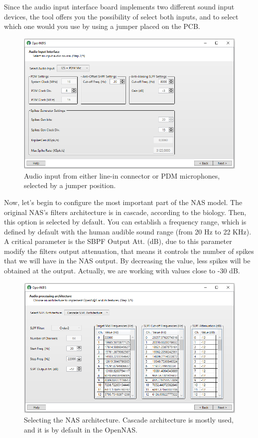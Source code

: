 Since the audio input interface board implements two different sound input devices, the tool offers you the possibility of select both inputs, and to select which one would you use by using a jumper placed on the PCB.

\begin{figure}[H]
\centering
\includegraphics[width=1\textwidth]{images/Img19_S2_SelectInput_4.PNG}
\caption{\label{fig:OpenNAS_s2_i2s_pdm}Audio input from either line-in connector or PDM microphones, selected by a jumper position.}
\end{figure}

Now, let's begin to configure the most important part of the NAS model. The original NAS's filters architecture is in cascade, according to the biology. Then, this option is selected by default. You can establish a frequency range, which is defined by default with the human audible sound range (from 20 Hz to 22 KHz). A critical parameter is the SBPF Output Att. (dB), due to this parameter modify the filters output attenuation, that means it controls the number of spikes that we will have in the NAS output. By decreasing the value, less spikes will be obtained at the output. Actually, we are working with values close to -30 dB. 

\begin{figure}[H]
\centering
\includegraphics[width=1\textwidth]{images/Img20_S3_Arch.PNG}
\caption{\label{fig:OpenNAS_s3_cascade}Selecting the NAS architecture. Cascade architecture is mostly used, and it is by default in the OpenNAS.}
\end{figure}

